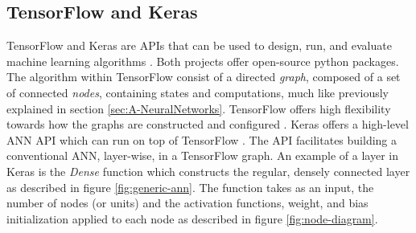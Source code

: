 \documentclass[../main.tex]{subfiles}
\begin{document}
\subsection{TensorFlow and Keras}
\label{sec:A-Tensorflow-and-Keras}
TensorFlow and Keras are \acp{API} that can be used to design, run, and evaluate machine learning algorithms \cite{tensorflow2015-whitepaper, chollet2015keras}.
Both projects offer open-source python packages.
The algorithm within TensorFlow consist of a directed \textit{graph}, composed of a set of connected \textit{nodes}, containing states and computations, much like previously explained in section \ref{sec:A-NeuralNetworks}.
TensorFlow offers high flexibility towards how the graphs are constructed and configured \cite{tensorflow2015-whitepaper}.
Keras offers a high-level \ac{ANN} \ac{API} which can run on top of TensorFlow \cite{chollet2015keras}.
The API facilitates building a conventional \ac{ANN}, layer-wise, in a TensorFlow graph.
An example of a layer in Keras is the \textit{Dense} function which constructs the regular, densely connected layer as described in figure \ref{fig:generic-ann}.
The function takes as an input, the number of nodes (or units) and the activation functions, weight, and bias initialization applied to each node as described in figure \ref{fig:node-diagram}.
\end{document}
